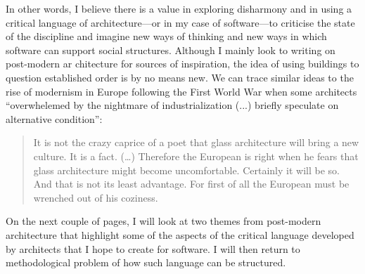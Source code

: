 In other words, I believe there is a value in exploring disharmony and in using a critical language of architecture---or in my case of software---to
criticise the state of the discipline and imagine new ways of thinking and new ways in which
software can support social structures. Although I mainly look to writing on post-modern ar
chitecture for sources of inspiration, the idea of using buildings to question established order
is by no means new. We can trace similar ideas to the rise of modernism in Europe following
the First World War when some architects ``overwhelemed by the nightmare of industrialization
(...) briefly speculate on alternative condition'':

\begin{quote}
It is not the crazy caprice of a poet that glass architecture will bring a new culture.
It is a fact. (\ldots) Therefore the European is right when he fears that glass architecture
might become uncomfortable. Certainly it will be so. And that is not its least advantage.
For first of all the European must be wrenched out of his coziness.
\end{quote}

On the next couple of pages, I will look at two themes from post-modern architecture that
highlight some of the aspects of the critical language developed by architects that I hope
to create for software. I will then return to methodological problem of how such language
can be structured.

\newpage

